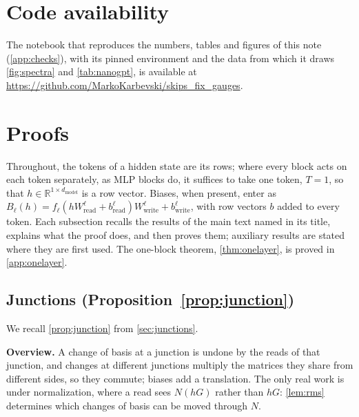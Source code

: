 \documentclass[10pt]{article}
\theoremstyle{definition}
\theoremstyle{remark}
\newcommand{\R}{\mathbb{R}}
\newcommand{\Wread}{W_{\mathrm{read}}}
\newcommand{\Wwrite}{W_{\mathrm{write}}}
\newcommand{\dm}{d_{\mathrm{model}}}
\newcommand{\para}[1]{\smallskip\noindent\textbf{#1}\hspace{0.5em}}
\begin{document}
\section*{Code availability}
The notebook that reproduces the numbers, tables and figures of this note (\cref{app:checks}), with its pinned environment and the data from which it draws \cref{fig:spectra} and \cref{tab:nanogpt}, is available at \url{https://github.com/MarkoKarbevski/skips_fix_gauges}.





\clearpage
\appendix
\setcounter{topnumber}{3}
\setcounter{totalnumber}{4}
\section{Proofs}\label{app:proofs}

Throughout, the tokens of a hidden state are its rows; where every block acts on each token separately, as MLP blocks do, it suffices to take one token, $T = 1$, so that $h \in \R^{1\times\dm}$ is a row vector. Biases, when present, enter as $B_\ell(h) = f_\ell(h\Wread^{\ell} + b^{\ell}_{\mathrm{read}})\Wwrite^{\ell} + b^{\ell}_{\mathrm{write}}$, with row vectors $b$ added to every token. Each subsection recalls the results of the main text named in its title, explains what the proof does, and then proves them; auxiliary results are stated where they are first used. The one-block theorem, \cref{thm:onelayer}, is proved in \cref{app:onelayer}.

\subsection{Junctions\texorpdfstring{ (Proposition~\ref*{prop:junction})}{}}\label{app:prf-junction}

We recall \cref{prop:junction} from \cref{sec:junctions}.
\propJunction*

\para{Overview.} A change of basis at a junction is undone by the reads of that junction, and changes at different junctions multiply the matrices they share from different sides, so they commute; biases add a translation. The only real work is under normalization, where a read sees $N(hG)$ rather than $hG$: \cref{lem:rms} determines which changes of basis can be moved through $N$.
\end{document}

